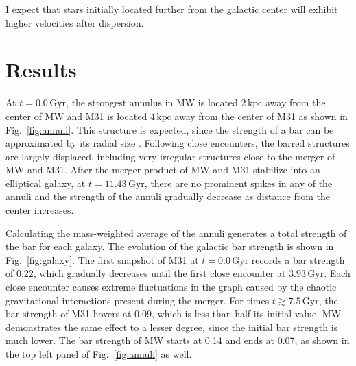 \documentclass[twocolumn]{aastex631}
\DeclareRobustCommand{\Figref}[1]{Fig.~\ref{#1}}
\begin{document}
I expect that stars initially located further from the galactic center
will exhibit higher velocities after dispersion.

\section{Results}

At $t=0.0\,\mathrm{Gyr}$, the strongest annulus in MW is located
$2\,\mathrm{kpc}$ away from the center of MW and M31 is located
$4 \,\mathrm{kpc}$ away from the center of M31 as shown in
\Figref{fig:annuli}. This structure is expected, since the strength of
a bar can be approximated by its radial size
\citep{rathore:25}. Following close encounters, the barred structures
are largely displaced, including very irregular structures close to
the merger of MW and M31. After the merger product of MW and M31
stabilize into an elliptical galaxy, at $t=11.43\,\mathrm{Gyr}$, there
are no prominent spikes in any of the annuli and the strength of the
annuli gradually decrease as distance from the center increases.

Calculating the mass-weighted average of the annuli generates a total
strength of the bar for each galaxy. The evolution of the galactic bar
strength is shown in \Figref{fig:galaxy}. The first snapshot of M31 at
$t=0.0\,\mathrm{Gyr}$ records a bar strength of 0.22, which gradually
decreases until the first close encounter at
$3.93\,\mathrm{Gyr}$. Each close encounter causes extreme fluctuations
in the graph caused by the chaotic gravitational interactions present
during the merger. For times $t \gtrsim 7.5\,\mathrm{Gyr}$, the bar
strength of M31 hovers at 0.09, which is less than half its initial
value. MW demonstrates the same effect to a lesser degree, since the
initial bar strength is much lower. The bar strength of MW starts at
0.14 and ends at 0.07, as shown in the top left panel of
\Figref{fig:annuli} as well.
\end{document}
